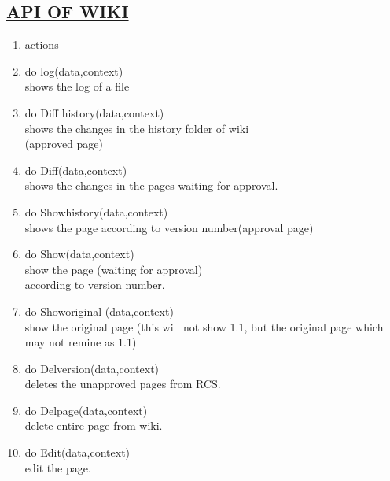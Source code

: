 \documentclass{article}
\begin{document}
\subsection*{\underline{API OF WIKI}}
\begin{enumerate}
\item[{}{}]
actions
\item do log(data,context)\\
 shows the log of a file
\item do Diff history(data,context)\\
 shows the changes in the history folder of wiki\\
(approved page)
\item do Diff(data,context)\\
shows the changes in the pages waiting for approval.
\item do Showhistory(data,context)\\
shows the page according to version number(approval page)
\item do Show(data,context)\\
show the page (waiting for approval)\\
according to version number.
\item do Showoriginal (data,context)\\
show the original page (this will not show 1.1, but the original page which may not remine as 1.1)
\item do Delversion(data,context)\\
deletes the unapproved pages from RCS.
\item do Delpage(data,context)\\
delete entire page from wiki.
\item do Edit(data,context)\\
edit the page.
 \end{enumerate}
\end{document}
